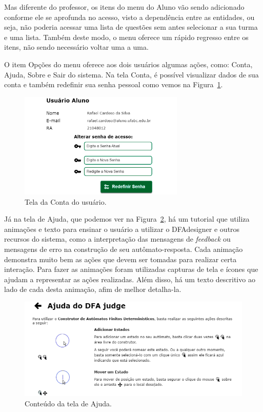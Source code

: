 \documentclass[
	12pt,				%
	openany,
	oneside,
	a4paper,			%
	english,			%
	brazil				%
	]{abntex2}
\begin{document}
  Mas diferente do professor, os itens do menu do Aluno vão sendo adicionado conforme ele se aprofunda no acesso, visto a dependência entre as entidades, ou seja, não poderia acessar uma lista de questões sem antes selecionar a sua turma e uma lista. Também deste modo, o menu oferece um rápido regresso entre os itens, não sendo necessário voltar uma a uma.
  
  O item Opções do menu oferece aos dois usuários algumas ações, como: Conta, Ajuda, Sobre e Sair do sistema. Na tela Conta, é possível visualizar dados de sua conta e também redefinir sua senha pessoal como vemos na Figura~\ref{print:conta}.
   
\begin{figure}[H]
  \centering
  \includegraphics[width=0.7\textwidth]{prints/conta.png}
  \caption{Tela da Conta do usuário.}
  \label{print:conta}
  \vspace{-0.5cm}
\end{figure}
  
  Já na tela de Ajuda, que podemos ver na Figura~\ref{print:ajuda}, há um tutorial que utiliza animações e texto para ensinar o usuário a utilizar o DFAdesigner e outros recursos do sistema, como a interpretação das mensagens de \textit{feedback} ou mensagens de erro na construção de seu autômato-resposta. Cada animação demonstra muito bem as ações que devem ser tomadas para realizar certa interação. Para fazer as animações foram utilizadas capturas de tela e ícones que ajudam a representar as ações realizadas. Além disso, há um texto descritivo ao lado de cada desta animação, afim de melhor detalha-la. %
     
\begin{figure}[H]
  \centering
  \includegraphics[width=\textwidth]{prints/ajuda.png}
  \caption{Conteúdo da tela de Ajuda.}
  \vspace{-0.2cm}
  \label{print:ajuda}
  \vspace{-0.5cm}
\end{figure}
    
\end{document}
